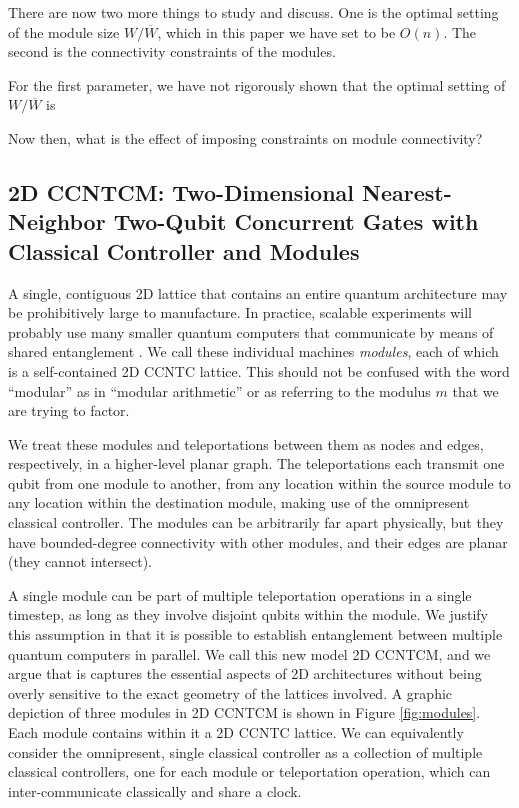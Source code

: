 There are now two more things to study and discuss. One is the optimal setting
of the module size $W/\overline{W}$, which in this paper we have set to
be $O(n)$. The second is the connectivity constraints of the modules.

For the first parameter, we have not rigorously shown that the optimal setting
of $W / \overline{W}$ is 

Now then, what is the effect of imposing constraints on module connectivity?

\subsection{\textsf{2D CCNTCM}: Two-Dimensional Nearest-Neighbor Two-Qubit Concurrent Gates with Classical Controller and Modules}
\label{subsec:2dccntcm}

A single, contiguous
2D lattice that contains an entire quantum architecture may be prohibitively large to manufacture. In practice,
scalable experiments will probably use many
smaller quantum computers that communicate by means of shared
entanglement \cite{Monroe2012}.
We call these individual machines \emph{modules}, each of
which is a self-contained \textsf{2D CCNTC} lattice. This should not be
confused with the word ``modular'' as in ``modular arithmetic'' or as
referring to the modulus $m$ that we are trying to factor.

We treat these modules
and teleportations between them as nodes and edges, respectively,
in a higher-level planar graph. The teleportations each transmit one qubit
from one module to another, from any location within the source module
to any location within the destination module, making use of the
omnipresent classical controller. The modules can be arbitrarily far
apart physically, but they have bounded-degree connectivity with other
modules, and their edges are planar (they cannot intersect).

A single module can be part of multiple teleportation operations in a single timestep, as long as they involve disjoint qubits within the module.
We justify this assumption in that it is
possible to establish entanglement between multiple
quantum computers
in parallel. We call this new model \textsf{2D CCNTCM},
and we argue that is captures the essential aspects of 2D architectures
without being overly sensitive to the exact geometry of the lattices involved.
A graphic depiction of three modules in \textsf{2D CCNTCM} is shown in
Figure \ref{fig:modules}. Each module contains within it a
\textsf{2D CCNTC} lattice. We can equivalently consider the omnipresent,
single
classical controller as a collection of multiple classical controllers, one
for each module or teleportation operation, which can inter-communicate
classically and share a clock.

